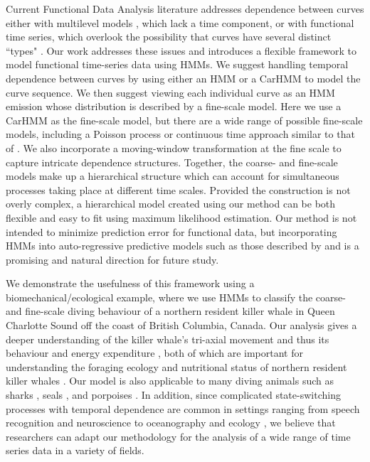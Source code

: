 

Current Functional Data Analysis literature addresses dependence between curves either with multilevel models \citep{Chen:2012,Di:2009}, which lack a time component, or with functional time series, which overlook the possibility that curves have several distinct ``types" \citep{Kokoszka:2018}. Our work addresses these issues and introduces a flexible framework to model functional time-series data using HMMs.
We suggest handling temporal dependence between curves by using either an HMM or a CarHMM to model the curve sequence. We then suggest viewing each individual curve as an HMM emission whose distribution is described by a fine-scale model. Here we use a CarHMM as the fine-scale model, but there are a wide range of possible fine-scale models, including a Poisson process or continuous time approach similar to that of \citet{Michelot:2019}. We also incorporate a moving-window transformation at the fine scale to capture intricate dependence structures. Together, the coarse- and fine-scale models make up a hierarchical structure which can account for simultaneous processes taking place at different time scales. Provided the construction is not overly complex, a hierarchical model created using our method can be both flexible and easy to fit using maximum likelihood estimation. Our method is not intended to minimize prediction error for functional data, but incorporating HMMs into auto-regressive predictive models such as those described by \citet{Aue:2015} and \citet{Gao:2019} is a promising and natural direction for future study. 

We demonstrate the usefulness of this framework using a biomechanical/ecological example, where we use HMMs to classify the coarse- and fine-scale diving behaviour of a northern resident killer whale in Queen Charlotte Sound off the coast of British Columbia, Canada. Our analysis gives a deeper understanding of the killer whale's tri-axial movement and thus its behaviour and energy expenditure \citep{Gleiss:2011,Qasem:2012}, both of which are important for understanding the foraging ecology and nutritional status of northern resident killer whales \citep{Noren:2011}. Our model is also applicable to many diving animals such as sharks \citep{Adam:2019}, seals \citep{Dot:2016}, and porpoises \citep{Barajas:2017}. In addition, since complicated state-switching processes with temporal dependence are common in settings ranging from speech recognition \citep{Juang:1991} and neuroscience \citep{Langrock:2013} to oceanography \citep{Bulla:2012} and ecology \citep{Adam:2019}, we believe that researchers can adapt our methodology for the analysis of a wide range of time series data in a variety of fields.